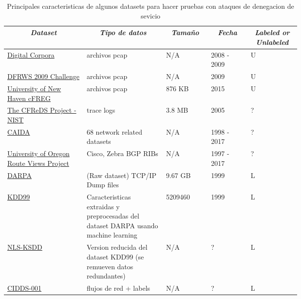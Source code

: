 \documentclass[12pt]{article}
\begin{document}
\begin{table}[htbp]
  \centering
  \footnotesize
  \begin{tabular}{|p{0.2\linewidth}|p{0.2\linewidth}|p{0.1\linewidth}|p{0.1\linewidth}|p{0.1\linewidth}|}\hline
    \multicolumn{1}{|c|}{\textit{\textbf{Dataset}}} & 
\multicolumn{1}{c|}{\textit{\textbf{Tipo de datos}}} &
\multicolumn{1}{|c|}{\textit{\textbf{Tamaño}}} & 
\multicolumn{1}{|c|}{\textit{\textbf{Fecha}}} &
\multicolumn{1}{|c|}{\textit{\textbf{Labeled or Unlabeled}}} \tabularnewline \hline

\href{http://digitalcorpora.org/corpora/packet-dumps}{Digital Corpora} & 
archivos pcap &
N/A & 
2008 - 2009 & 
U 
\tabularnewline \hline

\href{https://web.archive.org/web/20160311200806/http://dfrws.org/2009/challenge/submission.shtml}{DFRWS 2009 Challenge} & 
archivos pcap &
N/A & 
2009 & 
U 
\tabularnewline \hline

\href{https://www.unhcfreg.com/datasetsandtools}{University of New Haven cFREG} & 
archivos pcap &
876 KB & 
2015 & 
U 
\tabularnewline \hline

\href{https://www.cfreds.nist.gov/dfrws/Rhino_Hunt.html}{The CFReDS Project - NIST} & 
trace logs &
3.8 MB & 
2005 & 
? 
\tabularnewline \hline

\href{http://www.caida.org/data/overview/}{CAIDA} & 
68 network related datasets &
N/A & 
1998 - 2017 & 
? 
\tabularnewline \hline

\href{http://www.routeviews.org/routeviews/}{University of Oregon Route Views Project} & 
Cisco, Zebra BGP RIBs &
N/A & 
1997 - 2017 & 
? 
\tabularnewline \hline

\href{https://www.ll.mit.edu/r-d/datasets}{DARPA} & 
(Raw dataset) TCP/IP Dump  files &
9.67 GB & 
1999 & 
L 
\tabularnewline \hline

\href{http://kdd.ics.uci.edu/databases/kddcup99/kddcup99.html}{KDD99} & 
Caracteristicas extraidas y preprocesadas del dataset DARPA usando machine learning &
5209460 & 
1999 & 
L 
\tabularnewline \hline

\href{http://www.unb.ca/cic/datasets/nsl.html}{NLS-KSDD} & 
Version reducida del dataset KDD99 (se remueven datos redundantes) &
N/A &
? & 
L 
\tabularnewline \hline


\href{https://www.hs-coburg.de/forschung-kooperation/forschungsprojekte-oeffentlich/ingenieurwissenschaften/cidds-coburg-intrusion-detection-data-sets.html}{CIDDS-001} & 
flujos de red + labels &
N/A &
? & 
L 
\tabularnewline \hline

\end{tabular}
\caption{Principales caracteristicas de algunos datasets para hacer pruebas con ataques de denegacion de sevicio} \label{tab:sometab}
\end{table} 
\end{document}
